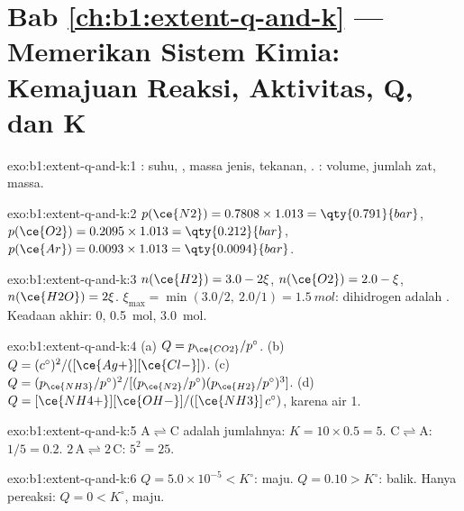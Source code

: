 \section*{Bab \ref{ch:b1:extent-q-and-k} --- Memerikan Sistem Kimia: Kemajuan Reaksi, Aktivitas, Q, dan K}

\begin{solution}{exo:b1:extent-q-and-k:1}
: suhu, , massa jenis, tekanan, .
: volume, jumlah zat, massa.
\end{solution}

\begin{solution}{exo:b1:extent-q-and-k:2}
$p(\ce{N2}) = 0.7808 \times 1.013 = \qty{0.791}{bar}$, $p(\ce{O2}) =
0.2095 \times 1.013 = \qty{0.212}{bar}$, $p(\ce{Ar}) = 0.0093 \times 1.013
= \qty{0.0094}{bar}$.
\end{solution}

\begin{solution}{exo:b1:extent-q-and-k:3}
$n(\ce{H2}) = 3.0 - 2\xi$, $n(\ce{O2}) = 2.0 - \xi$, $n(\ce{H2O}) =
2\xi$. $\xi_{\max} = \min(3.0/2,\ 2.0/1) = \qty{1.5}{mol}$: dihidrogen
adalah . Keadaan akhir:  0, 
\qty{0.5}{mol},  \qty{3.0}{mol}.
\end{solution}

\begin{solution}{exo:b1:extent-q-and-k:4}
(a) $Q = p_{\ce{CO2}}/p^\circ$. (b) $Q = (c^\circ)^2/([\ce{Ag+}][\ce{Cl-}])$.
(c) $Q = (p_{\ce{NH3}}/p^\circ)^2/[(p_{\ce{N2}}/p^\circ)(p_{\ce{H2}}/p^\circ)^3]$.
(d) $Q = [\ce{NH4+}][\ce{OH-}]/([\ce{NH3}]\,c^\circ)$, karena  air 1.
\end{solution}

\begin{solution}{exo:b1:extent-q-and-k:5}
$\mathrm{A \rightleftharpoons C}$ adalah jumlahnya: $K = 10 \times 0.5 = 5$. $\mathrm{C \rightleftharpoons A}$: $1/5 =
0.2$. $\mathrm{2\,A \rightleftharpoons 2\,C}$: $5^2 = 25$.
\end{solution}

\begin{solution}{exo:b1:extent-q-and-k:6}
$Q = 5.0 \times 10^{-5} < K^\circ$: maju. $Q = 0.10 > K^\circ$: balik.
Hanya pereaksi: $Q = 0 < K^\circ$, maju.
\end{solution}


